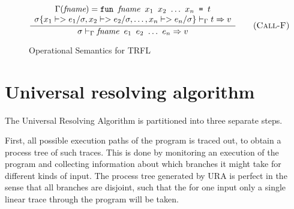 \documentclass[10pt]{../sigplanconf}
\newcommand{\nfrac}[2]{\frac{\displaystyle{#1}}{\displaystyle{#2}}}
\newcommand{\tagsc}[1]{\tag{\scshape #1}}
\begin{document}
\begin{figure}
\begin{equation}
{  }
  \tagsc{Call-G}
\end{equation}

\begin{equation}
  \nfrac{
    \begin{array}{c}
      \Gamma(\textit{fname}) =
        \texttt{fun \textit{\rmfamily fname} $x_1$ $x_2$ $\ldots$ $x_n$ = $t$}
        \\
      \sigma\{x_1 |-> e_1/\sigma, x_2 |-> e_2/\sigma, \ldots, x_n |-> e_n/\sigma\} |-_\Gamma t => v
    \end{array}
  }{
    \sigma |-_\Gamma \texttt{\textit{\rmfamily fname} $e_1$ $e_2$ $\ldots$ $e_n$} => v
  } \tagsc{Call-F}
\end{equation}


\caption{Operational Semantics for TRFL}
\label{fig:semantics}
\end{figure}


\section{Universal resolving algorithm}
The Universal Resolving Algorithm is partitioned into three separate
steps.

First, all possible execution paths of the program is traced out, to
obtain a process tree of such traces. This is done by monitoring an
execution of the program and collecting information about which
branches it might take for different kinds of input. The process tree
generated by URA is perfect in the sense that all branches are
disjoint, such that the for one input only a single linear trace
through the program will be taken.
\end{document}
